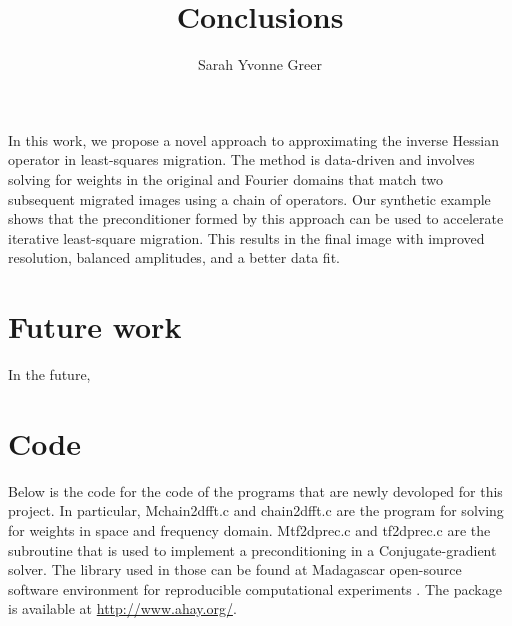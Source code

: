 \title{Conclusions}
\author{Sarah Yvonne Greer}
\label{ch:chapter-conclusion}

\maketitle



In this work, we propose a novel approach to approximating the inverse Hessian operator in least-squares migration. The method is data-driven and involves solving for weights in the original and Fourier domains that match two subsequent migrated images using a chain of operators. Our synthetic example shows that the preconditioner formed by this approach can be used to accelerate iterative least-square migration. This results in the final image with improved resolution, balanced amplitudes, and a better data fit.



\section{Future work}
In the future, 

\appendix
\section{Code}
Below is the code for the code of the programs that are newly devoloped for this project. In particular, Mchain2dfft.c and chain2dfft.c are the program for solving for weights in space and frequency domain. Mtf2dprec.c and tf2dprec.c are the subroutine that is used to implement a preconditioning in a Conjugate-gradient solver. The library used in those can be found at Madagascar open-source software environment for reproducible computational experiments \cite[]{madagascar}. The package is available at \url{http://www.ahay.org/}.


